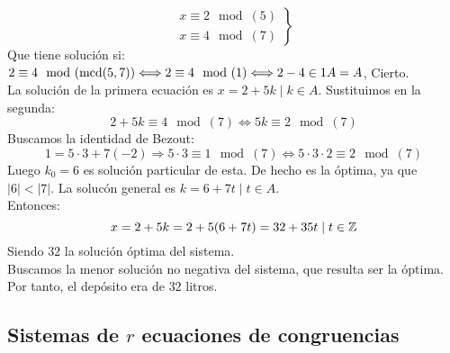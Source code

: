 \begin{ejemplo}
    $$\left. \begin{array}{l}
            x \equiv 2 \mod(5) \\
            x \equiv 4 \mod(7)
        \end{array} \right\}$$
    Que tiene solución si: \newline
    $2\equiv 4\mod(\operatorname{mcd}(5,7)) \Longleftrightarrow 2\equiv 4\mod(1) \Longleftrightarrow 2-4 \in 1A = A$, Cierto.\\

    
    \noindent La solución de la primera ecuación es $x=2+5k \mid k \in A$. Sustituimos en la segunda:
    $$2+5k \equiv 4 \mod(7) \Longleftrightarrow 5k\equiv 2\mod(7)$$
    Buscamos la identidad de Bezout:
    $$1=5\cdot 3 + 7(-2) \Longrightarrow 5\cdot 3\equiv 1\mod(7) \Longleftrightarrow 5 \cdot 3 \cdot 2 \equiv 2 \mod(7)$$
    Luego $k_0=6$ es solución particular de esta. De hecho es la óptima, ya que $|6|<|7|$. La solucón general es
    $k=6+7t \mid t \in A$.\\

    
    Entonces:
    $$x=2+5k = 2+5(6+7t) = 32 + 35 t \mid t \in \mathbb Z$$
    Siendo $32$ la solución óptima del sistema.\\

    
    \noindent Buscamos la menor solución no negativa del sistema, que resulta ser la óptima. Por tanto, el depósito era de $32$ litros.
\end{ejemplo}

\subsection{Sistemas de $r$ ecuaciones de congruencias}

